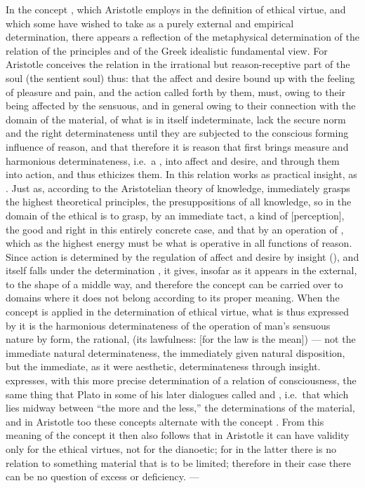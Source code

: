In the concept , which Aristotle employs in the definition of ethical virtue, and which some have wished to take as
a purely external and empirical determination, there appears a
reflection of the metaphysical determination of the relation of the principles and of the Greek idealistic fundamental view. For Aristotle
conceives the relation in the irrational but
reason-receptive part of the soul (the sentient soul) thus: that
the affect and desire bound up with the feeling of pleasure and pain, and the action called forth by them, must, owing to their
being affected by the sensuous, and in general owing to their
connection with the domain of the material, of what is in itself indeterminate,
lack the secure norm and the right determinateness until they are subjected to the conscious forming influence of reason, and that therefore it is reason that first brings measure and harmonious determinateness, i.e.\ a , into affect and desire,
and through them into action, and thus ethicizes them. In
this relation  works as practical insight, as .
Just as, according to the Aristotelian theory of knowledge,  immediately grasps the highest theoretical principles, the presuppositions of all knowledge, so in the domain of the ethical
 is to grasp, by an immediate tact, a kind of  [perception], the
good and right in this entirely concrete case, and that by an
operation of , which as the highest energy must be what is
operative in all functions of reason. Since action is determined
by the regulation of affect and desire by insight (), and itself falls under the determination , it gives, insofar as it appears in
the external, to  the shape of a middle way, and therefore
the concept  can be carried over to domains where it does not belong
according to its proper meaning. When the concept is applied in the determination of ethical virtue, what is thus
expressed by it is the harmonious determinateness of the operation of man's
sensuous nature by form, the rational, (its
lawfulness:  [for the law is the mean]) --- not the immediate natural determinateness, the immediately given natural disposition, but
the immediate, as it were aesthetic, determinateness through
insight.  expresses, with this more precise determination of a relation of consciousness, the same thing that Plato in some
of his later dialogues called  and , i.e.\ that
which lies midway between ``the more and the less,'' the determinations of the material, and in Aristotle too these
concepts alternate with the concept . From this meaning of the concept it then also follows that in Aristotle it can have
validity only for the ethical virtues, not for the dianoetic; for
in the latter there is no relation to something material that is to be
limited; therefore in their case there can be no question of excess or deficiency. ---


